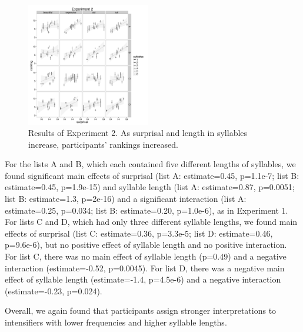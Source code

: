 \documentclass[10pt,letterpaper]{article}
\begin{document}
\begin{figure}[ht]
\begin{center}
\includegraphics[width=0.48\textwidth]{analysis_files_for_writeup/images/exp2-plot.png}
\end{center}
\caption{Results of Experiment 2. As surprisal and length in syllables increase, participants' rankings increased.} 
\label{exp2-plot}
\end{figure}


For the lists A and B, which each contained five different lengths of syllables, we found significant main effects of surprisal (list A: estimate=0.45, p=1.1e-7; list B: estimate=0.45, p=1.9e-15) and syllable length (list A: estimate=0.87, p=0.0051; list B: estimate=1.3, p=2e-16) and a significant interaction (list A: estimate=0.25, p=0.034; list B: estimate=0.20, p=1.0e-6), as in Experiment 1.
For lists C and D, which had only three different syllable lengths, we found main effects of surprisal (list C: estimate=0.36, p=3.3e-5; list D: estimate=0.46, p=9.6e-6), but no positive effect of syllable length and no positive interaction.
For list C, there was no main effect of syllable length (p=0.49) and a negative interaction (estimate=-0.52, p=0.0045). For list D, there was a negative main effect of syllable length (estimate=-1.4, p=4.5e-6) and a negative interaction (estimate=-0.23, p=0.024).

Overall, we again found that participants assign stronger interpretations to intensifiers with lower frequencies and higher syllable lengths.

\end{document}
